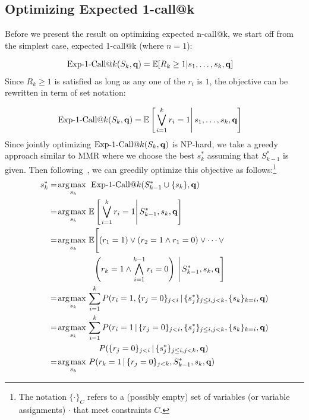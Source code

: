 \subsection{Optimizing Expected 1-call@k}
Before we present the result on optimizing expected n-call@k, we start off from the simplest case, expected 1-call@k (where $n=1$):

\begin{align}
    \ExpOneCall(S_k,\vec{q}) & = \mathbb{E}[R_k\geq 1|s_1,\dots,s_k,\vec{q}]
\end{align}
Since $R_k\geq 1$ is satisfied as long as any one of the $r_i$ is $1$, the objective can be rewritten in term of set notation:

\begin{align}
\label{eq:setRelevance}
    \ExpOneCall(S_k,\vec{q}) & = \mathbb{E} \left[\left. \bigvee_{i=1}^{k}r_i=1 \right| s_{1},\dots, s_{k},\vec{q} \right]
\end{align}
Since jointly optimizing $\ExpOneCall(S_k,\vec{q})$ is NP-hard, we
take a greedy approach similar to MMR where we choose the best $s_k^*$
assuming that $S_{k-1}^*$ is given.  Then following~\cite{chen06Less},
we can greedily optimize this objective as 
follows:\footnote{The notation $\{ \cdot \}_C$ refers to 
a (possibly empty) set of 
variables (or variable assignments) $\cdot$ that meet constraints $C$.}
\begin{align}
s_k^* & = \argmax_{s_k} \; \ExpOneCall(S_{k-1}^* \cup \{ s_k \},\vec{q}) \nonumber \\
   & = \argmax_{s_k} \mathbb{E}\left[\left. \bigvee_{i=1}^{k} r_i=1 \right| S_{k-1}^*, s_{k},\vec{q}\right] \nonumber \\
   & = \argmax_{s_k} \mathbb{E}\Bigg[  (r_1=1) \vee (r_2 =1 \wedge r_1=0) \vee \cdots \vee \nonumber \\
   & \hspace{19mm} \left(r_k=1 \wedge \bigwedge_{i=1}^{k-1} r_i=0 \right) \, \Bigg| \, S_{k-1}^*,s_k,\vec{q} \Bigg] \label{eq:logicalsplit} \\
   & = \argmax_{s_k} \sum_{i=1}^{k} P(  r_i=1, \{ r_{j}=0 \}_{j<i} \, | \, \{ s^*_j \}_{j\leq i,j<k},\{ s_{k} \}_{k=i},\vec{q}) \nonumber \\
   &= \argmax_{s_k} \sum_{i=1}^{k} P(  r_i=1 \, | \, \{ r_{j}=0 \}_{j<i} , \{ s^*_j \}_{j\leq i,j<k},\{ s_k \}_{k=i},\vec{q}) \nonumber\\
   & \hspace{21.5mm} P(\{ r_{j}=0 \}_{j<i} \, | \, \{ s^*_j \}_{j\leq i,j<k}, \vec{q}) \nonumber \\
   &= \argmax_{s_k} P( r_k=1 \, | \, \{ r_{j}=0 \}_{j<k}, S_{k-1}^*,s_k,\vec{q}) \label{eq:set-objective}
\end{align}

